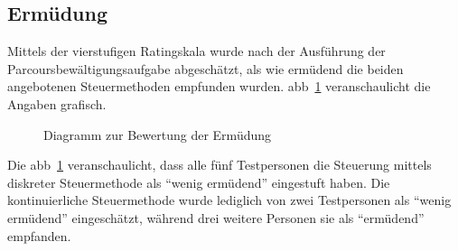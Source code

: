 \subsection{Ermüdung}
Mittels der vierstufigen Ratingskala wurde nach der Ausführung der Parcoursbewältigungsaufgabe abgeschätzt, als wie ermüdend die beiden angebotenen Steuermethoden empfunden wurden. \acl{abb}~\ref{fig:ermüdung} veranschaulicht die Angaben grafisch.
\begin{figure}[ht]
\begin{minipage}[b]{\linewidth} 
      \centering 
{}
\caption{Diagramm zur Bewertung der Ermüdung}
\label{fig:ermüdung}
   \end{minipage}%
\end{figure}

Die \acl{abb}~\ref{fig:ermüdung} veranschaulicht, dass alle fünf Testpersonen die Steuerung mittels diskreter Steuermethode als \enquote{wenig ermüdend} eingestuft haben. Die kontinuierliche Steuermethode wurde lediglich von zwei Testpersonen als \enquote{wenig ermüdend} eingeschätzt, während drei weitere Personen sie als \enquote{ermüdend} empfanden. 

